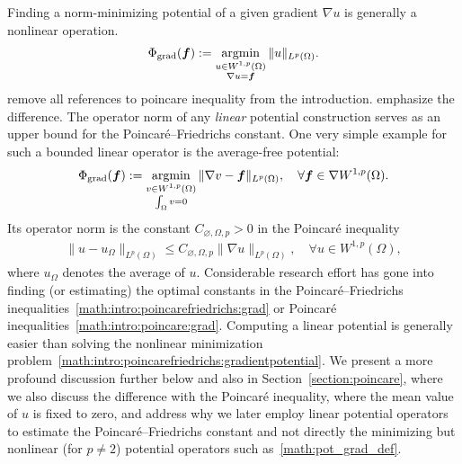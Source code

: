 \documentclass[10pt,a4paper]{article}
\newcommand{\mwl}[1]{{\color{red}#1}}
\begin{document}
Finding a norm-minimizing potential of a given gradient $\nabla u$ is generally a nonlinear operation.
\begin{align}\label{math:pot_grad_def}
    \Phi_{\operatorname{grad}}( \bm{f} ) := \operatorname*{{\rm argmin}}\limits_{ \substack{ u \in W^{1,p}(\Omega) \\ \nabla u = \bm{f} } } \| u \|_{L^{p}(\Omega)}.
\end{align}
\mwl{remove all references to poincare inequality from the introduction. emphasize the difference.}
The operator norm of any \emph{linear} potential construction serves as an upper bound for the Poincar\'e--Friedrichs constant. 
One very simple example for such a bounded linear operator is the average-free potential: 
\begin{align}\label{math:intro:poincarefriedrichs:gradientpotential}
    \Phi_{\operatorname{grad}}( \bm{f} ) 
    := 
    \operatorname*{{\rm argmin}}\limits_{ \substack{ v \in W^{1,p}(\Omega) \\ \int_\Omega v = 0 } } \| \nabla v - \bm{f} \|_{L^{p}(\Omega)},
    \quad 
    \forall 
    \bm{f} \in \nabla W^{1,p}(\Omega)
    .
\end{align} 
Its operator norm is the constant $C_{\varnothing,\Omega,p} > 0$ in the Poincar\'e inequality 
\begin{align}\label{math:intro:poincare:grad}
    \| u - u_{\Omega} \|_{L^{p}(\Omega)}
    \leq 
    C_{\varnothing,\Omega,p} \| \nabla u \|_{L^{p}(\Omega)},
    \quad 
    \forall 
    u \in W^{1,p}(\Omega)
    , \tag{P} 
\end{align}
where $u_\Omega$ denotes the average of $u$.
Considerable research effort has gone into finding (or estimating) the optimal constants in the Poincar\'e--Friedrichs inequalities~\eqref{math:intro:poincarefriedrichs:grad} or Poincar\'e inequalities~\eqref{math:intro:poincare:grad}. 
Computing a linear potential is generally easier than solving the nonlinear minimization problem~\eqref{math:intro:poincarefriedrichs:gradientpotential}. 
%
We present a more profound discussion further below and also in Section~\ref{section:poincare}, where we also discuss the difference with the Poincar\'e inequality, where the mean value of $u$ is fixed to zero, and address why we later employ linear potential operators to estimate the Poincar\'e--Friedrichs constant and not directly the minimizing but nonlinear (for $p \neq 2$) potential operators such as~\eqref{math:pot_grad_def}. 
\end{document}

